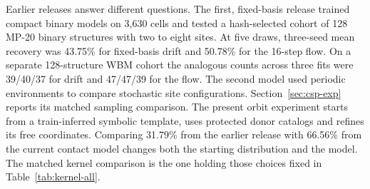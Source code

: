 Earlier releases answer different questions. The first, fixed-basis release trained compact binary models on 3,630 cells and tested a hash-selected cohort of 128 MP-20 binary structures with two to eight sites. At five draws, three-seed mean recovery was 43.75\% for fixed-basis drift and 50.78\% for the 16-step flow. On a separate 128-structure WBM cohort the analogous counts across three fits were 39/40/37 for drift and 47/47/39 for the flow. The second model used periodic environments to compare stochastic site configurations. Section~\ref{sec:csp-exp} reports its matched sampling comparison. The present orbit experiment starts from a train-inferred symbolic template, uses protected donor catalogs and refines its free coordinates. Comparing 31.79\% from the earlier release with 66.56\% from the current contact model changes both the starting distribution and the model. The matched kernel comparison is the one holding those choices fixed in Table~\ref{tab:kernel-all}.
